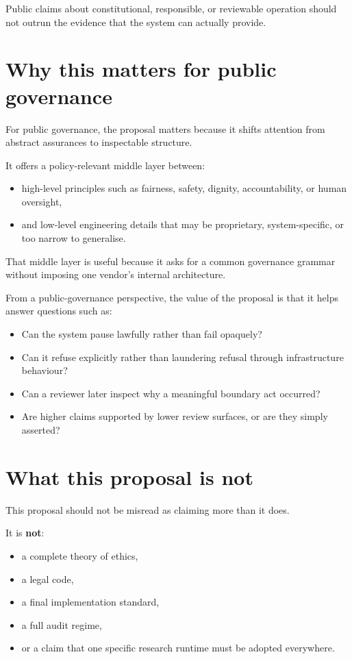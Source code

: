 \documentclass[11pt]{article}
\begin{document}
Public claims about constitutional, responsible, or reviewable operation should not outrun the evidence that the system can actually provide.

\section{Why this matters for public governance}

For public governance, the proposal matters because it shifts attention from abstract assurances to inspectable structure.

It offers a policy-relevant middle layer between:
\begin{itemize}[leftmargin=2em]
    \item high-level principles such as fairness, safety, dignity, accountability, or human oversight,
    \item and low-level engineering details that may be proprietary, system-specific, or too narrow to generalise.
\end{itemize}

That middle layer is useful because it asks for a common governance grammar without imposing one vendor's internal architecture.

From a public-governance perspective, the value of the proposal is that it helps answer questions such as:
\begin{itemize}[leftmargin=2em]
    \item Can the system pause lawfully rather than fail opaquely?
    \item Can it refuse explicitly rather than laundering refusal through infrastructure behaviour?
    \item Can a reviewer later inspect why a meaningful boundary act occurred?
    \item Are higher claims supported by lower review surfaces, or are they simply asserted?
\end{itemize}

\section{What this proposal is not}

This proposal should not be misread as claiming more than it does.

It is \textbf{not}:
\begin{itemize}[leftmargin=2em]
    \item a complete theory of ethics,
    \item a legal code,
    \item a final implementation standard,
    \item a full audit regime,
    \item or a claim that one specific research runtime must be adopted everywhere.
\end{itemize}
\end{document}
